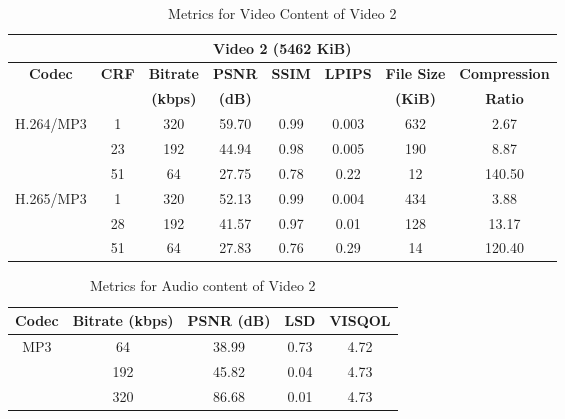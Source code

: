     

    \begin{table}[H]
        \centering
        \caption{Metrics for Video Content of Video 2}
        \label{table:vid-met-2}
        \begin{tabular}{|c|c|c|c|c|c|c|c|}
        \hline
        \multicolumn{8}{|c|}{\textbf{Video 2 (5462 KiB)}} \\ \hline
        \multirow{2}{*}{\textbf{Codec}} & \multirow{2}{*}{\textbf{CRF}} & \textbf{Bitrate} & \textbf{PSNR} & \textbf{SSIM} & \textbf{LPIPS} & \textbf{File Size} & \textbf{Compression} \\ 
        &  & \textbf{(kbps)} & \textbf{(dB)} &  &  & \textbf{(KiB)} & \textbf{Ratio} \\ \hline
        \multirow{3}{*}{H.264/MP3} & 1  & 320 & 59.70 & 0.99 & 0.003 & 632 & 2.67 \\ \cline{2-8} 
                                & 23 & 192 & 44.94 & 0.98 & 0.005 & 190 & 8.87 \\ \cline{2-8} 
                                & 51 & 64  & 27.75 & 0.78 & 0.22 & 12  & 140.50 \\ \hline
        \multirow{3}{*}{H.265/MP3} & 1  & 320 & 52.13 & 0.99 & 0.004 & 434 & 3.88 \\ \cline{2-8} 
                                & 28 & 192 & 41.57 & 0.97 & 0.01 & 128 & 13.17 \\ \cline{2-8} 
                                & 51 & 64  & 27.83 & 0.76 & 0.29 & 14  & 120.40 \\ \hline
        \end{tabular}
    \end{table}
    

    \begin{table}[H]
        \centering
        \caption{Metrics for Audio content of Video 2}
        \label{table:aud-met-2}
        \begin{tabular}{|c|c|c|c|c|}
        \hline
        \textbf{Codec} & \textbf{Bitrate (kbps)} & \textbf{PSNR (dB)} & \textbf{LSD} & \textbf{VISQOL} \\ \hline
        \multirow{3}{*}{MP3} & 64  & 38.99 & 0.73 & 4.72 \\ \cline{2-5} 
                                   & 192 & 45.82 & 0.04 & 4.73 \\ \cline{2-5} 
                                   & 320 & 86.68 & 0.01 & 4.73 \\ \hline
        \end{tabular}
    \end{table}
    




